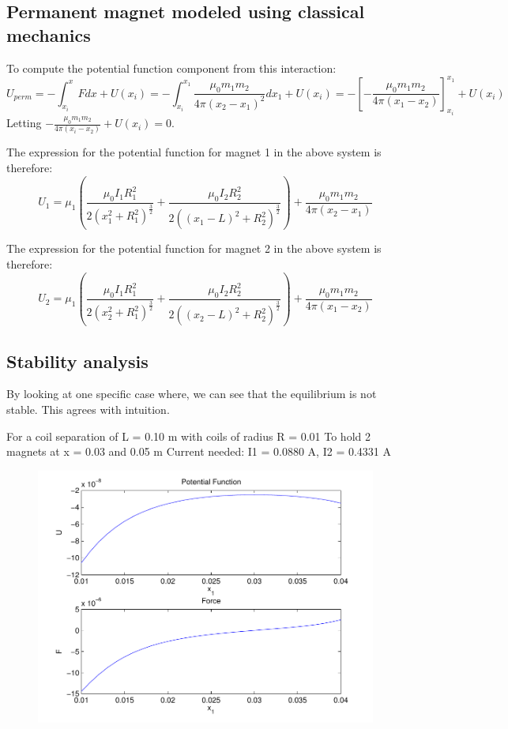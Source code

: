 \documentclass[english]{article}
\begin{document}
\subsection{Permanent magnet modeled using classical mechanics}
To compute the potential function component from this interaction:
$$U_{perm} = -\int_{x_i}^{x}F dx + U\left(x_i\right) = -\int_{x_i}^{x_1}\frac{\mu_0 m_1 m_2}{4 \pi \left(x_2-x_1\right)^2} dx_1 + U\left( x_i \right) = -\left[-\frac{\mu_0 m_1 m_2}{4\pi \left(x_1 - x_2\right)} \right]_{x_i}^{x_1} + U\left(x_i\right)$$
Letting $-\frac{\mu_0 m_1 m_2}{4\pi \left(x_i - x_2\right)} + U\left(x_i\right) = 0$.  

The expression for the potential function for magnet 1 in the above system is therefore:
$$U_1 = \mu_1\left(\frac{\mu_0 I_1 R_{1}^{2}}{2 \left(x_1^2 + R_1^2 \right)^{\frac{3}{2}}} + \frac{\mu_0 I_2 R_{2}^{2}}{2 \left(\left(x_1 - L \right)^2 + R_2^2 \right)^{\frac{3}{2}}} \right) + \frac{\mu_0 m_1 m_2}{4\pi \left(x_2 - x_1\right)}$$


The expression for the potential function for magnet 2 in the above system is therefore:
$$U_2 = \mu_1\left(\frac{\mu_0 I_1 R_{1}^{2}}{2 \left(x_2^2 + R_1^2 \right)^{\frac{3}{2}}} + \frac{\mu_0 I_2 R_{2}^{2}}{2 \left(\left(x_2 - L \right)^2 + R_2^2 \right)^{\frac{3}{2}}} \right) + \frac{\mu_0 m_1 m_2}{4\pi \left(x_1 - x_2\right)}$$

\subsection{Stability analysis}
By looking at one specific case where, we can see that the equilibrium is not stable.  This agrees with intuition.

For a coil separation of L = 0.10 m with coils of radius R = 0.01 
To hold 2 magnets at x = 0.03 and 0.05 m
Current needed: I1 =  0.0880 A, I2 =  0.4331 A
\begin{figure}[H]
	\centering
	\includegraphics[width = 5in]{figures/UF_unstable.pdf}
\end{figure}
\end{document}
